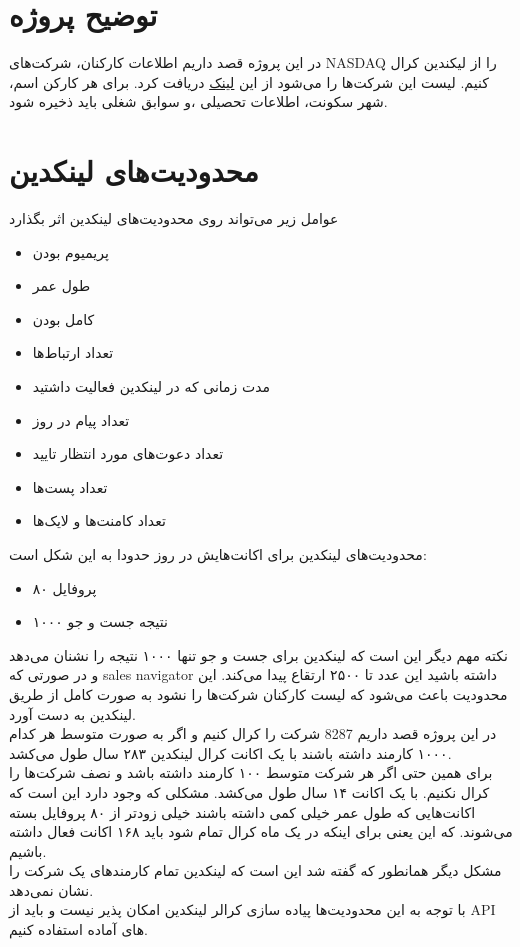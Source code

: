 \section{توضیح پروژه}
در این پروژه قصد داریم اطلاعات کارکنان، شرکت‌های NASDAQ را از لیکندین کرال کنیم.
لیست این شرکت‌ها را می‌شود از این
\href{https://www.nasdaq.com/market-activity/stocks/screener}{لینک}
دریافت کرد. برای هر کارکن اسم، شهر سکونت، اطلاعات تحصیلی ،و سوابق شغلی باید ذخیره شود.

\section{محدودیت‌های لینکدین}
عوامل زیر می‌تواند روی محدودیت‌های لینکدین اثر بگذارد
\begin{itemize}
    \item پریمیوم بودن
    \item طول عمر
    \item کامل بودن
    \item تعداد ارتباط‌ها
    \item مدت زمانی که در لینکدین فعالیت داشتید
    \item تعداد پیام در روز
    \item تعداد دعوت‌های مورد انتظار تایید
    \item تعداد پست‌ها
    \item تعداد کامنت‌ها و لایک‌ها
\end{itemize}

محدودیت‌های لینکدین برای اکانت‌هایش در روز حدودا به این شکل است:
\begin{itemize}
    \item ۸۰ پروفایل
    \item ۱۰۰۰ نتیجه جست و جو
\end{itemize}
نکته مهم دیگر این است که لینکدین برای جست و جو تنها ۱۰۰۰ نتیجه را نشنان می‌دهد و در صورتی که sales navigator داشته باشید این عدد تا ۲۵۰۰ ارتقاع پیدا می‌کند. این محدودیت باعث می‌شود که لیست کارکنان شرکت‌ها را نشود به صورت کامل از طریق لینکدین به دست آورد.\\
در این پروژه قصد داریم 8287 شرکت را کرال کنیم و اگر به صورت متوسط هر کدام ۱۰۰۰ کارمند داشته باشند با یک اکانت کرال لینکدین ۲۸۳ سال طول می‌کشد.\\
برای همین حتی اگر هر شرکت متوسط ۱۰۰ کارمند داشته باشد و نصف شرکت‌ها را کرال نکنیم. با یک اکانت ۱۴ سال طول می‌کشد. مشکلی که وجود دارد این است که اکانت‌هایی که طول عمر خیلی کمی داشته باشند خیلی زودتر از ۸۰ پروفایل بسته می‌شوند. که این یعنی برای اینکه در یک ماه کرال تمام شود باید ۱۶۸ اکانت فعال داشته باشیم.\\
مشکل دیگر همانطور که گفته شد این است که لینکدین تمام کارمند‌های یک شرکت را نشان نمی‌دهد.\\
با توجه به این محدودیت‌ها پیاده سازی کرالر لینکدین امکان پذیر نیست و باید از API های آماده استفاده کنیم.

